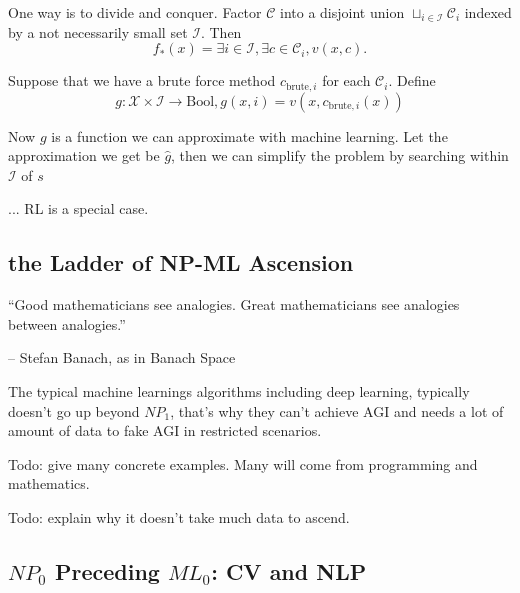 \documentclass[../main.tex]{subfiles}
\begin{document}
One way is to divide and conquer. Factor $\mathcal{C}$ into a disjoint union $\sqcup_{i\in \mathcal{I}} \mathcal{C}_{i}$ indexed by a not necessarily small set $\mathcal{I}$. Then
\begin{equation}
	f_*(x)=\exists i\in \mathcal{I}, \exists c\in \mathcal{C}_i, v(x,c).
\end{equation}

Suppose that we have a brute force method $c_{\text{brute},i}$ for each $\mathcal{C}_i$. Define
\begin{equation}
	g: \mathcal{X}\times \mathcal{I} \rightarrow \text{Bool}, g(x, i) = v(x, c_{\text{brute},i}(x))
\end{equation}

Now $g$ is a function we can approximate with machine learning. Let the approximation we get be $\hat{g}$, then we can simplify the problem by searching within $\mathcal{I}$ of $s$

... RL is a special case.

\subsection{the Ladder of NP-ML Ascension}
``Good mathematicians see analogies. Great mathematicians see analogies between analogies.''

\hfill -- Stefan Banach, as in Banach Space


\begin{center}
\end{center}

The typical machine learnings algorithms including deep learning, typically doesn't go up beyond $NP_1$, that's why they can't achieve AGI and needs a lot of amount of data to fake AGI in restricted scenarios.

Todo: give many concrete examples. Many will come from programming and mathematics.

Todo: explain why it doesn't take much data to ascend.

\subsection{$NP_0$ Preceding $ML_0$: CV and NLP}
\end{document}
